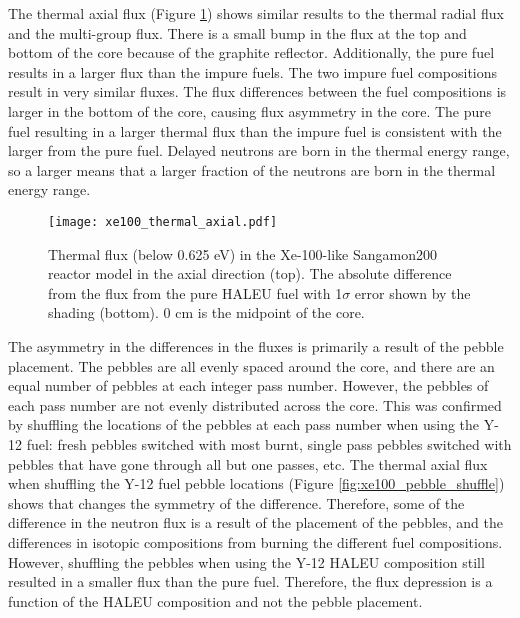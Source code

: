 The thermal axial flux (Figure \ref{fig:xe100_thermal_axial}) shows 
similar results to the thermal radial flux and the multi-group flux. 
There is a small bump in the 
flux at the top and bottom of the core because of the graphite reflector.
Additionally, the pure fuel results in a larger flux than 
the impure fuels. The two impure fuel compositions result in very 
similar fluxes. The flux differences between the fuel compositions is 
larger in the bottom of the core, causing flux asymmetry in the core. The
pure fuel resulting in a larger thermal flux than the impure fuel is consistent with the larger \betaEff 
from the pure fuel. Delayed neutrons are born in the thermal energy range, 
so a larger \betaEff means that a larger fraction of the neutrons are 
born in the thermal energy range. 

\begin{figure}[ht]
        \centering 
        \texttt{[image: xe100\_thermal\_axial.pdf]}
        \caption{Thermal flux (below 0.625 eV) in the Xe-100-like Sangamon200 
        reactor model in the axial direction (top). The absolute 
        difference from the flux from 
        the pure \gls{HALEU} fuel with 1$\sigma$ error shown by 
        the shading (bottom). 0 cm is the midpoint of the core.}
        \label{fig:xe100_thermal_axial}
\end{figure}

The asymmetry in the differences in 
the fluxes is primarily a result of the pebble placement. The 
pebbles are all evenly spaced around the core, and there are an equal 
number of pebbles at each integer pass number. However, the pebbles of 
each pass number are not evenly distributed across the core. 
This was confirmed by shuffling the locations of the pebbles at each 
pass number when using the Y-12 fuel: fresh pebbles switched with most 
burnt, single pass pebbles switched with pebbles that have gone through 
all but one passes, etc. The thermal axial flux when shuffling the Y-12 
fuel  
pebble locations (Figure \ref{fig:xe100_pebble_shuffle}) shows that 
changes the symmetry of the difference. Therefore, some of the difference 
in the neutron flux is a result of the placement of the pebbles, and 
the differences in isotopic compositions from burning the different 
fuel compositions. However, shuffling the pebbles when using the Y-12 
\gls{HALEU} composition still resulted in a smaller flux than the 
pure fuel. Therefore, the flux depression is a function of the 
\gls{HALEU} composition and not the pebble placement.

